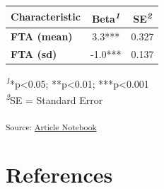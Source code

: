 \documentclass[
]{agujournal2019}
\begin{document}
\setlength{\LTpost}{0mm}
\begin{longtable*}{lcc}
\toprule
\textbf{Characteristic} & \textbf{Beta}\textsuperscript{\textit{1}} & \textbf{SE}\textsuperscript{\textit{2}} \\ 
\midrule\addlinespace[2.5pt]
\textbf{FTA (mean)} & 3.3*** & 0.327 \\ 
\textbf{FTA (sd)} & -1.0*** & 0.137 \\ 
\bottomrule
\end{longtable*}
\begin{minipage}{\linewidth}
\textsuperscript{\textit{1}}*p\textless{}0.05; **p\textless{}0.01; ***p\textless{}0.001\\
\textsuperscript{\textit{2}}SE = Standard Error\\
\end{minipage}

\textsubscript{Source:
\href{https://fgabriel1891.github.io/quarto_template_rstudio/index-preview.html}{Article
Notebook}}

\section{References}\label{references}
\end{document}
